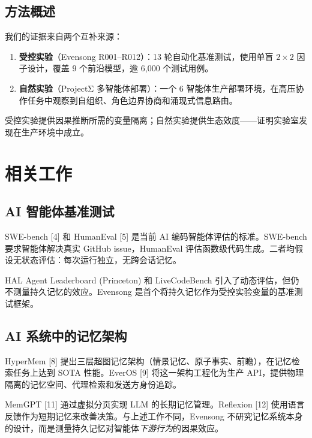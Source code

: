 \documentclass[11pt, a4paper]{article}
\begin{document}
\subsection{方法概述}

我们的证据来自两个互补来源：

\begin{enumerate}
  \item \textbf{受控实验}（Evensong R001--R012）：13 轮自动化基准测试，使用单盲 $2 \times 2$ 因子设计，覆盖 9 个前沿模型，逾 6{,}000 个测试用例。
  \item \textbf{自然实验}（ProjectΣ 多智能体部署）：一个 6 智能体生产部署环境，在高压协作任务中观察到自组织、角色边界协商和涌现式信息路由。
\end{enumerate}

受控实验提供因果推断所需的变量隔离；自然实验提供生态效度——证明实验室发现在生产环境中成立。

\section{相关工作}

\subsection{AI 智能体基准测试}

SWE-bench [4] 和 HumanEval [5] 是当前 AI 编码智能体评估的标准。SWE-bench 要求智能体解决真实 GitHub issue，HumanEval 评估函数级代码生成。二者均假设无状态评估：每次运行独立，无跨会话记忆。

HAL Agent Leaderboard (Princeton) 和 LiveCodeBench 引入了动态评估，但仍不测量持久记忆的效应。Evensong 是首个将持久记忆作为受控实验变量的基准测试框架。

\subsection{AI 系统中的记忆架构}

HyperMem [8] 提出三层超图记忆架构（情景记忆、原子事实、前瞻），在记忆检索任务上达到 SOTA 性能。EverOS [9] 将这一架构工程化为生产 API，提供物理隔离的记忆空间、代理检索和发送方身份追踪。

MemGPT [11] 通过虚拟分页实现 LLM 的长期记忆管理。Reflexion [12] 使用语言反馈作为短期记忆来改善决策。与上述工作不同，Evensong 不研究记忆系统本身的设计，而是测量持久记忆对智能体\textit{下游行为}的因果效应。
\end{document}
